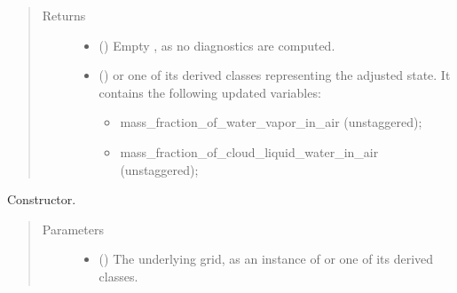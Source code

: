 \documentclass[letterpaper,10pt,english]{sphinxmanual}
\begin{document}
\begin{fulllineitems}
\begin{fulllineitems}
\begin{quote}
\begin{description}
\begin{itemize}
\end{itemize}

\item[{Returns}] \leavevmode
\begin{itemize}
\item {} 
 () \textendash{} Empty {\hyperref[\detokenize{api:storages.grid_data.GridData}]{}}, as no diagnostics are computed.

\item {} 
 () \textendash{} {\hyperref[\detokenize{api:storages.grid_data.GridData}]{}} or one of its derived classes representing the adjusted state.
It contains the following updated variables:
\begin{itemize}
\item {} 
mass\_fraction\_of\_water\_vapor\_in\_air (unstaggered);

\item {} 
mass\_fraction\_of\_cloud\_liquid\_water\_in\_air (unstaggered);

\end{itemize}

\end{itemize}


\end{description}\end{quote}

\end{fulllineitems}


\begin{fulllineitems}
\label{\detokenize{api:parameterizations.adjustment_microphysics_kessler_wrf_saturation.AdjustmentMicrophysicsKesslerWRFSaturation.__init__}}
Constructor.
\begin{quote}\begin{description}
\item[{Parameters}] \leavevmode\begin{itemize}
\item {} 
 () \textendash{} The underlying grid, as an instance of {\hyperref[\detokenize{api:grids.grid_xyz.GridXYZ}]{}} or one of its derived classes.


\end{itemize}
\end{description}
\end{quote}
\end{fulllineitems}
\end{fulllineitems}
\end{document}
